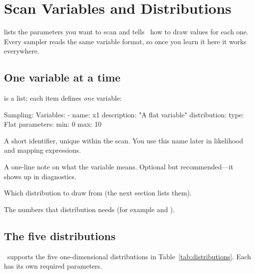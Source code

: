 \chapter{Scan Variables and Distributions}
\label{ch:variables}

 lists the parameters you want to scan and tells \Jarvis\
how to draw values for each one. Every sampler reads the same variable format, so once you learn
it here it works everywhere.

\section{One variable at a time}
\label{sec:var-schema}

 is a list; each item defines \emph{one} variable:

\begin{yamlwin}
Sampling:
  Variables:
    - name: x1
      description: "A flat variable"
      distribution:
        type: Flat
        parameters:
          min: 0
          max: 10
\end{yamlwin}

\begin{description}[style=nextline, leftmargin=1.2em]
  \item[\yamlkey{name}] A short identifier, unique within the scan. You use this name later in
        likelihood and mapping expressions.
  \item[\yamlkey{description}] A one-line note on what the variable means. Optional but
        recommended---it shows up in diagnostics.
  \item[\yamlkey{distribution.type}] Which distribution to draw from (the next section lists
        them).
  \item[\yamlkey{distribution.parameters}] The numbers that distribution needs (for example
        \yamlkey{min} and \yamlkey{max}).
\end{description}

\section{The five distributions}
\label{sec:distributions}

\Jarvis\ supports the five one-dimensional distributions in Table~\ref{tab:distributions}. Each
has its own required parameters.

